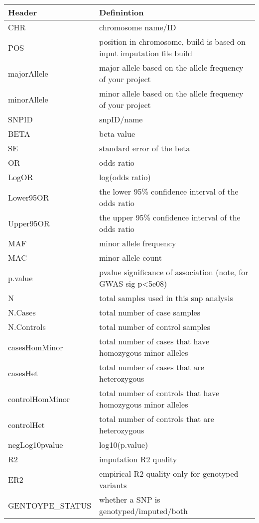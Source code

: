 \documentclass[letterpaper,10pt,english]{sphinxmanual}
\begin{document}
\begin{savenotes}\sphinxattablestart
\centering
\begin{tabulary}{\linewidth}[t]{|T|T|}
\hline
\sphinxstyletheadfamily 
Header
&\sphinxstyletheadfamily 
Definintion
\\
\hline
CHR
&
chromosome name/ID
\\
\hline
POS
&
position in chromosome, build is based on input imputation file build
\\
\hline
majorAllele
&
major allele based on the allele frequency of your project
\\
\hline
minorAllele
&
minor allele based on the allele frequency of your project
\\
\hline
SNPID
&
snpID/name
\\
\hline
BETA
&
beta value
\\
\hline
SE
&
standard error of the beta
\\
\hline
OR
&
odds ratio
\\
\hline
LogOR
&
log(odds ratio)
\\
\hline
Lower95OR
&
the lower 95\% confidence interval of the odds ratio
\\
\hline
Upper95OR
&
the upper 95\% confidence interval of the odds ratio
\\
\hline
MAF
&
minor allele frequency
\\
\hline
MAC
&
minor allele count
\\
\hline
p.value
&
pvalue significance of association (note, for GWAS sig p\textless{}5e\sphinxhyphen{}08)
\\
\hline
N
&
total samples used in this snp analysis
\\
\hline
N.Cases
&
total number of case samples
\\
\hline
N.Controls
&
total number of control samples
\\
\hline
casesHomMinor
&
total number of cases that have homozygous minor alleles
\\
\hline
casesHet
&
total number of cases that are heterozygous
\\
\hline
controlHomMinor
&
total number of controls that have homozygous minor alleles
\\
\hline
controlHet
&
total number of controls that are heterozygous
\\
\hline
negLog10pvalue
&
\sphinxhyphen{}log10(p.value)
\\
\hline
R2
&
imputation R2 quality
\\
\hline
ER2
&
empirical R2 quality  \sphinxhyphen{}\sphinxhyphen{} only for genotyped variants
\\
\hline
GENTOYPE\_STATUS
&
whether a SNP is genotyped/imputed/both
\\
\hline
\end{tabulary}
\par
\sphinxattableend\end{savenotes}
\end{document}
